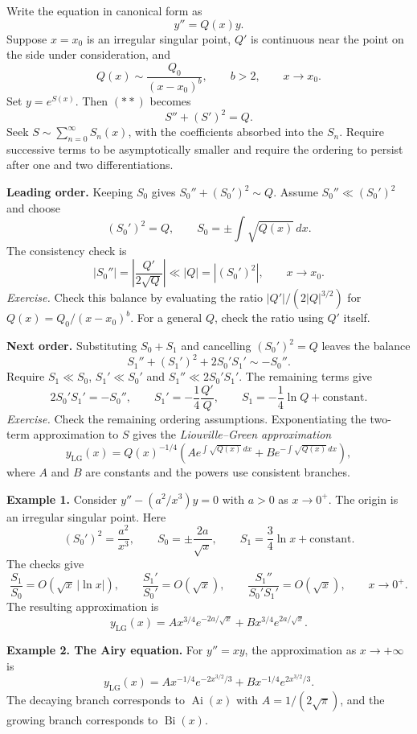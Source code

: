 \documentclass[11pt,a4paper]{article}
\begin{document}
Write the equation in canonical form as
\begin{equation}
    y''=Q(x)y.
    \tag{$**$}
\end{equation}
Suppose $x=x_0$ is an irregular singular point, $Q'$ is continuous
near the point on the side under consideration, and
\[
    Q(x)\sim\frac{Q_0}{(x-x_0)^b},\qquad b>2,\qquad x\to x_0.
\]
Set $y=e^{S(x)}$. Then $(**)$ becomes
\[
    S''+(S')^2=Q.
\]
Seek $S\sim\sum_{n=0}^{\infty}S_n(x)$, with the coefficients absorbed
into the $S_n$. Require successive terms to be asymptotically smaller
and require the ordering to persist after one and two differentiations.

\medskip
\noindent\textbf{Leading order.}
Keeping $S_0$ gives $S_0''+(S_0')^2\sim Q$. Assume
$S_0''\ll(S_0')^2$ and choose
\[
    (S_0')^2=Q,\qquad S_0=\pm\int\sqrt{Q(x)}\,dx.
\]
The consistency check is
\[
    |S_0''|=\left|\frac{Q'}{2\sqrt Q}\right|\ll |Q|
        =|(S_0')^2|,\qquad x\to x_0.
\]
\emph{Exercise.} Check this balance by evaluating the ratio
$|Q'|/(2|Q|^{3/2})$ for $Q(x)=Q_0/(x-x_0)^b$. For a general $Q$,
check the ratio using $Q'$ itself.

\medskip
\noindent\textbf{Next order.}
Substituting $S_0+S_1$ and cancelling $(S_0')^2=Q$ leaves the balance
\[
    S_1''+(S_1')^2+2S_0'S_1'\sim -S_0''.
\]
Require $S_1\ll S_0$, $S_1'\ll S_0'$ and
$S_1''\ll 2S_0'S_1'$. The remaining terms give
\[
    2S_0'S_1'=-S_0'',\qquad
    S_1'=-\frac14\frac{Q'}{Q},\qquad
    S_1=-\frac14\ln Q+\text{constant}.
\]
\emph{Exercise.} Check the remaining ordering assumptions.
Exponentiating the two-term approximation to $S$ gives the
\emph{Liouville--Green approximation}
\[
    y_{\mathrm{LG}}(x)=Q(x)^{-1/4}
        \left(Ae^{\int\sqrt{Q(x)}\,dx}
              +Be^{-\int\sqrt{Q(x)}\,dx}\right),
\]
where $A$ and $B$ are constants and the powers use consistent branches.

\medskip
\noindent\textbf{Example 1.}
Consider $y''-(a^2/x^3)y=0$ with $a>0$ as $x\to0^+$.
The origin is an irregular singular point. Here
\[
    (S_0')^2=\frac{a^2}{x^3},\qquad
    S_0=\pm\frac{2a}{\sqrt x},\qquad
    S_1=\frac34\ln x+\text{constant}.
\]
The checks give
\[
    \frac{S_1}{S_0}=O(\sqrt x\,|\ln x|),\qquad
    \frac{S_1'}{S_0'}=O(\sqrt x),\qquad
    \frac{S_1''}{S_0'S_1'}=O(\sqrt x),
    \qquad x\to0^+.
\]
The resulting approximation is
\[
    y_{\mathrm{LG}}(x)=Ax^{3/4}e^{-2a/\sqrt x}
                      +Bx^{3/4}e^{2a/\sqrt x}.
\]

\medskip
\noindent\textbf{Example 2. The Airy equation.}
For $y''=xy$, the approximation as $x\to+\infty$ is
\[
    y_{\mathrm{LG}}(x)=Ax^{-1/4}e^{-2x^{3/2}/3}
                      +Bx^{-1/4}e^{2x^{3/2}/3}.
\]
The decaying branch corresponds to $\operatorname{Ai}(x)$ with
$A=1/(2\sqrt{\pi})$, and the growing branch corresponds to
$\operatorname{Bi}(x)$.
\end{document}
